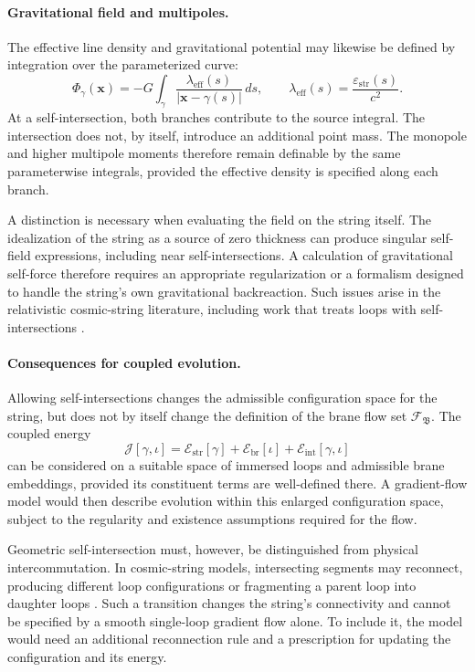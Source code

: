 \documentclass{article}
\numberwithin{tm}{section}
\numberwithin{dn}{section}
\numberwithin{as}{section}
\numberwithin{rk}{section}
\numberwithin{lem}{section}
\numberwithin{ax}{section}
\numberwithin{pp}{section}
\numberwithin{eg}{section}
\numberwithin{war}{section}
\numberwithin{equation}{section}
\numberwithin{prop}{section}
\numberwithin{nt}{section}
\numberwithin{rc}{section}
\begin{document}
\paragraph{Gravitational field and multipoles.}
The effective line density and gravitational potential may likewise
be defined by integration over the parameterized curve:
\[
\Phi_\gamma(\mathbf{x})
=
-G\int_\gamma
\frac{\lambda_{\mathrm{eff}}(s)}
{|\mathbf{x}-\gamma(s)|}\,ds,
\qquad
\lambda_{\mathrm{eff}}(s)
=
\frac{\varepsilon_{\mathrm{str}}(s)}{c^2}.
\]
At a self-intersection, both branches contribute to the source
integral. The intersection does not, by itself, introduce an
additional point mass. The monopole and higher multipole moments
therefore remain definable by the same parameterwise integrals,
provided the effective density is specified along each branch.

A distinction is necessary when evaluating the field on the string
itself. The idealization of the string as a source of zero thickness
can produce singular self-field expressions, including near
self-intersections. A calculation of gravitational self-force
therefore requires an appropriate regularization or a formalism
designed to handle the string's own gravitational backreaction.
Such issues arise in the relativistic cosmic-string literature,
including work that treats loops with self-intersections
\cite{ChernoffFlanaganWardell2019StringBackreaction}.

\paragraph{Consequences for coupled evolution.}
Allowing self-intersections changes the admissible configuration
space for the string, but does not by itself change the definition
of the brane flow set \(\mathcal F_{\mathfrak B}\). The coupled
energy
\[
\mathcal J[\gamma,\iota]
=
\mathcal E_{\mathrm{str}}[\gamma]
+
\mathcal E_{\mathrm{br}}[\iota]
+
\mathcal E_{\mathrm{int}}[\gamma,\iota]
\]
can be considered on a suitable space of immersed loops and
admissible brane embeddings, provided its constituent terms are
well-defined there. A gradient-flow model would then describe
evolution within this enlarged configuration space, subject to
the regularity and existence assumptions required for the flow.

Geometric self-intersection must, however, be distinguished from
physical intercommutation. In cosmic-string models, intersecting
segments may reconnect, producing different loop configurations
or fragmenting a parent loop into daughter loops
\cite{CasperAllen1995RealisticLoops,Thompson1988CosmicStringDynamics,Vachaspati1989SelfIntersections}. Such a transition changes the
string's connectivity and cannot be specified by a smooth
single-loop gradient flow alone. To include it, the model would
need an additional reconnection rule and a prescription for
updating the configuration and its energy.
\end{document}

